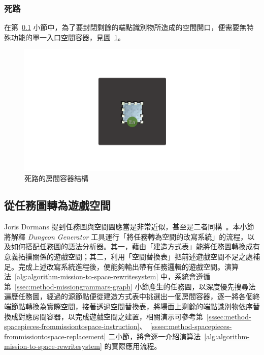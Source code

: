 \subsubsection{死路}
\label{sssec:method-spacepieces-types-wall}

在第~\ref{ssec:method-spacepieces-frommissiontospace} 小節中，為了要封閉剩餘的端點識別物所造成的空間開口，便需要無特殊功能的單一入口空間容器，見圖~\ref{fig:roomtype-wall}。

\begin{figure}[!htb]
  \begin{center}
    \includegraphics[width=1.0\textwidth]{figures/roomtype-wall.pdf}
    \caption{死路的房間容器結構}
    \label{fig:roomtype-wall}
  \end{center}
\end{figure}

\subsection{從任務圖轉為遊戲空間}
\label{ssec:method-spacepieces-frommissiontospace}

Joris Dormans 提到任務圖與空間圖應當是非常近似，甚至是二者同構~\cite{dormans2010adventures}。本小節將解釋 \textit{Dungeon Generator} 工具運行「將任務轉為空間的改寫系統」的流程，以及如何搭配任務圖的語法分析器。其一，藉由「建造方式表」能將任務圖轉換成有意義拓撲關係的遊戲空間；其二，利用「空間替換表」把前述遊戲空間不足之處補足。完成上述改寫系統進程後，便能夠輸出帶有任務邏輯的遊戲空間。演算法~\ref{alg:algorithm-mission-to-space-rewritesystem} 中，系統會遵循第~\ref{ssec:method-missiongrammars-graph} 小節產生的任務圖，以深度優先搜尋法遍歷任務圖，經過的源節點便從建造方式表中挑選出一個房間容器，逐一將各個終端節點轉換為實際空間，接著透過空間替換表，將場面上剩餘的端點識別物依序替換成對應房間容器，以完成遊戲空間之建置，相關演示可參考第~\ref{sssec:method-spacepieces-frommissiontospace-instruction}、~\ref{sssec:method-spacepieces-frommissiontospace-replacement} 二小節，將會逐一介紹演算法~\ref{alg:algorithm-mission-to-space-rewritesystem} 的實際應用流程。

